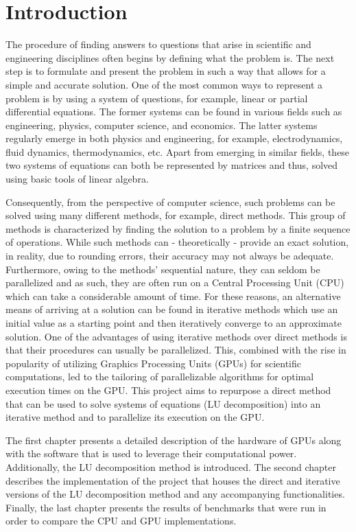 \chapter*{Introduction}		 		 		 %

The procedure of finding answers to questions that arise in scientific and engineering disciplines often begins by defining what the problem is. The next step is to formulate and present the problem in such a way that allows for a simple and accurate solution. One of the most common ways to represent a problem is by using a system of questions, for example, linear or partial differential equations. The former systems can be found in various fields such as engineering, physics, computer science, and economics. The latter systems regularly emerge in both physics and engineering, for example, electrodynamics, fluid dynamics, thermodynamics, etc. Apart from emerging in similar fields, these two systems of equations can both be represented by matrices and thus, solved using basic tools of linear algebra.
\par Consequently, from the perspective of computer science, such problems can be solved using many different methods, for example, direct methods. This group of methods is characterized by finding the solution to a problem by a finite sequence of operations. While such methods can - theoretically - provide an exact solution, in reality, due to rounding errors, their accuracy may not always be adequate. Furthermore, owing to the methods' sequential nature, they can seldom be parallelized and as such, they are often run on a Central Processing Unit (CPU) which can take a considerable amount of time. For these reasons, an alternative means of arriving at a solution can be found in iterative methods which use an initial value as a starting point and then iteratively converge to an approximate solution. One of the advantages of using iterative methods over direct methods is that their procedures can usually be parallelized. This, combined with the rise in popularity of utilizing Graphics Processing Units (GPUs) for scientific computations, led to the tailoring of parallelizable algorithms for optimal execution times on the GPU. This project aims to repurpose a direct method that can be used to solve systems of equations (LU decomposition) into an iterative method and to parallelize its execution on the GPU.
\par The first chapter presents a detailed description of the hardware of GPUs along with the software that is used to leverage their computational power. Additionally, the LU decomposition method is introduced. The second chapter describes the implementation of the project that houses the direct and iterative versions of the LU decomposition method and any accompanying functionalities. Finally, the last chapter presents the results of benchmarks that were run in order to compare the CPU and GPU implementations.